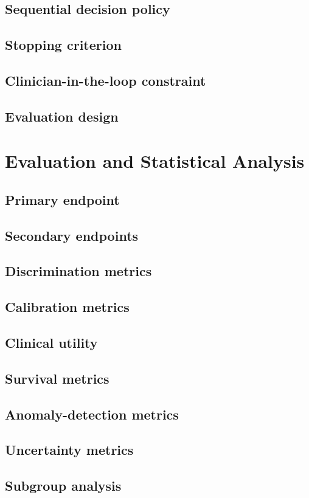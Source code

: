 \documentclass[10pt,journal]{IEEEtran}
\begin{document}
\subsection{Sequential decision policy}
\subsection{Stopping criterion}
\subsection{Clinician-in-the-loop constraint}
\subsection{Evaluation design}

\section{Evaluation and Statistical Analysis}
\subsection{Primary endpoint}
\subsection{Secondary endpoints}
\subsection{Discrimination metrics}
\subsection{Calibration metrics}
\subsection{Clinical utility}
\subsection{Survival metrics}
\subsection{Anomaly-detection metrics}
\subsection{Uncertainty metrics}
\subsection{Subgroup analysis}
\end{document}
